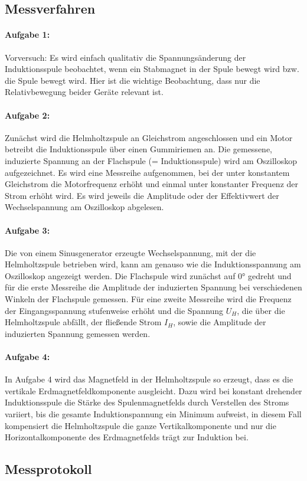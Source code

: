 \subsection{Messverfahren}
\paragraph{Aufgabe 1:} Vorversuch: Es wird einfach qualitativ die Spannungsänderung der Induktionsspule beobachtet, wenn ein
Stabmagnet in der Spule bewegt wird bzw. die Spule bewegt wird. Hier ist die wichtige Beobachtung, dass nur die Relativbewegung beider Geräte relevant ist. 

\paragraph{Aufgabe 2:} Zunächst wird die Helmholtzspule an Gleichstrom angeschlossen und ein Motor betreibt die Induktionsspule über einen Gummiriemen an. Die gemessene, induzierte Spannung an der Flachspule (= Induktionsspule) wird am Oszilloskop aufgezeichnet. Es wird eine Messreihe aufgenommen, bei der unter konstantem Gleichstrom die Motorfrequenz erhöht und einmal unter konstanter Frequenz der Strom erhöht wird. Es wird jeweils die Amplitude oder der Effektivwert der Wechselspannung am Oszilloskop abgelesen.

\paragraph{Aufgabe 3:}  Die von einem Sinusgenerator erzeugte Wechselspannung, mit der die Helmholtzspule betrieben wird, kann am genauso wie die Induktionsspannung am Oszilloskop angezeigt werden. Die Flachspule wird zunächst auf \(\ang{0}\) gedreht und für die erste Messreihe die Amplitude der induzierten Spannung bei verschiedenen Winkeln der Flachspule gemessen. Für eine zweite Messreihe wird die Frequenz der Eingangsspannung stufenweise erhöht und die Spannung \(U_H\), die über die Helmholtzspule abfällt, der fließende Strom \(I_H\), sowie die Amplitude der induzierten Spannung gemessen werden. 

\paragraph{Aufgabe 4:} In Aufgabe 4 wird das Magnetfeld in der Helmholtzspule so erzeugt, dass es die vertikale Erdmagnetfeldkomponente ausgleicht. Dazu wird bei konstant drehender Induktionsspule die Stärke des Spulenmagnetfelds durch Verstellen des Stroms variiert, bis die gesamte Induktionspannung ein Minimum aufweist, in diesem Fall kompensiert die Helmholtzspule die ganze Vertikalkomponente und nur die Horizontalkomponente des Erdmagnetfelds trägt zur Induktion bei. 
\vfill
\subsection{Messprotokoll}

